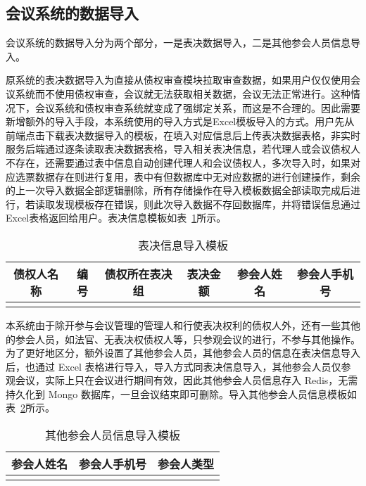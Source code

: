 \subsection{会议系统的数据导入}
会议系统的数据导入分为两个部分，一是表决数据导入，二是其他参会人员信息导入。

原系统的表决数据导入为直接从债权审查模块拉取审查数据，如果用户仅仅使用会议系统而不使用债权审查，会议就无法获取相关数据，会议无法正常进行。这种情况下，会议系统和债权审查系统就变成了强绑定关系，而这是不合理的。因此需要新增额外的导入手段，本系统使用的导入方式是Excel模板导入的方式。用户先从前端点击下载表决数据导入的模板，在填入对应信息后上传表决数据表格，非实时服务后端通过逐条读取表决数据表格，导入相关表决信息，若代理人或会议债权人不存在，还需要通过表中信息自动创建代理人和会议债权人，多次导入时，如果对应选票数据存在则进行复用，表中有但数据库中无对应数据的进行创建操作，剩余的上一次导入数据全部逻辑删除，所有存储操作在导入模板数据全部读取完成后进行，若读取发现模板存在错误，则此次导入数据不存回数据库，并将错误信息通过Excel表格返回给用户。表决信息模板如表~\ref{fig:meetingImport}所示。

\begin{table}[h!]
    \begin{center}
      \caption{表决信息导入模板}
      \label{fig:meetingImport}
      \begin{tabular}{c c c c c c }
        \hline
        \textbf{债权人名称} & \textbf{编号} & \textbf{债权所在表决组} & \textbf{表决金额} & \textbf{参会人姓名} & \textbf{参会人手机号} \\
        \hline
        \\
        \hline
      \end{tabular}
    \end{center}
  \end{table}

本系统由于除开参与会议管理的管理人和行使表决权利的债权人外，还有一些其他的参会人员，如法官、无表决权债权人等，只参观会议的进行，不参与其他操作。为了更好地区分，额外设置了其他参会人员，其他参会人员的信息在表决信息导入后，也通过 Excel 表格进行导入，导入方式同表决信息导入，其他参会人员仅参观会议，实际上只在会议进行期间有效，因此其他参会人员信息存入 Redis，无需持久化到 Mongo 数据库，一旦会议结束即可删除。导入其他参会人员信息模板如表~\ref{fig:otherUserImport}所示。

\begin{table}[h!]
    \begin{center}
      \caption{其他参会人员信息导入模板}
      \label{fig:otherUserImport}
      \begin{tabular}{ c c c }
        \hline
       \textbf{参会人姓名} & \textbf{参会人手机号} & \textbf{参会人类型} \\
       \hline
       \\
       \hline
      \end{tabular}
    \end{center}
  \end{table}

